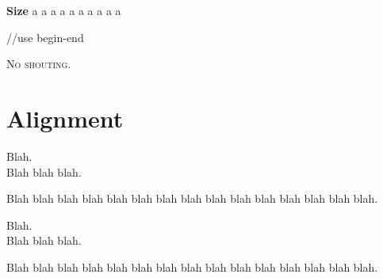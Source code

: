 \documentclass{vldb}
\begin{document}
\textbf{Size}
\tiny a \scriptsize a \footnotesize a \small a \normalsize a \large a \Large a \LARGE a \huge a \Huge a  \begin{small} //use begin-end \end{small}

\normalsize \textsc{No shouting}.

\section{Alignment}
\begin{center}
       Blah.\\ Blah blah blah.
       
       Blah blah blah blah blah blah blah blah blah blah blah blah blah blah blah. 
\end{center}

\begin{flushleft} 
       Blah.\\ Blah blah blah.

       Blah blah blah blah blah blah blah blah blah blah blah blah blah blah blah. 
\end{flushleft}



\end{document}
